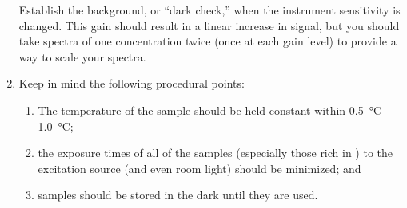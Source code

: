 \documentclass[nobib,nofonts,nols,nohyper]{tufte-handout}
\begin{document}
\begin{enumerate}
	Establish the background, or ``dark check,'' when the instrument sensitivity is changed.
  This gain should result in a linear increase in signal, but you should take spectra of one concentration twice (once at each gain level) to provide a way to scale your spectra. 
	\item Keep in mind the following procedural points: 
	\begin{enumerate}
		\item The temperature of the sample should be held constant within \qtyrange{0.5}{1.0}{\celsius}; 
		\item the exposure times of all of the samples (especially those rich in ) to the excitation source (and even room light) should be minimized; and 
		\item samples should be stored in the dark until they are used.
	\end{enumerate}
\end{enumerate}

\end{document}
